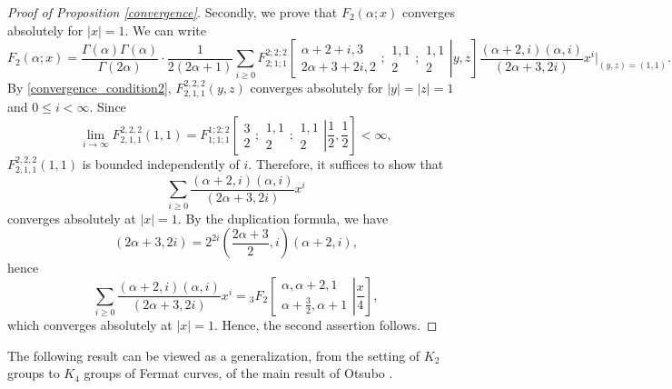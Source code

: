 \documentclass[11pt,a4,leqno]{amsart}
\theoremstyle{my theoremstyle}
\theoremstyle{dfn}
\theoremstyle{remark}
\renewcommand{\1}{\mathbbm{1}}
\newcommand{\al}{\alpha}
\numberwithin{equation}{section}
\begin{document}
\begin{proof}[Proof of Proposition \ref{convergence}]
Secondly, we prove that $F_2(\alpha; x)$ converges absolutely for $|x|=1$.   
We can write 
$$F_2(\al; x)=\dfrac{\Gamma\left(\al \right)\Gamma\left(\al\right)}{\Gamma\left(2\al \right)} \cdot \dfrac{1}{2(2 \alpha+1)}
\sum_{i \geq 0}
F_{2;1;1}^{2;2;2}\left[\left.
\begin{matrix}
\alpha+2+i, 3 \\
2 \alpha+3+2i, 2
\end{matrix}
; 
\begin{matrix}
1, 1 \\
2
\end{matrix}
;
\begin{matrix}
1, 1 \\
2
\end{matrix}
\right| y, z
\right]
\dfrac{(\alpha+2, i)(\alpha, i)}{(2\alpha+3, 2i)}x^i
\big|_{(y, z)=(1,1)}. 
$$
By \eqref{convergence_condition2}, $F_{2,1,1}^{2,2,2}(y, z)$ converges absolutely for $|y|=|z|=1$ and $0 \le i < \infty$.  
Since 
$$\lim_{i \to \infty}F_{2,1,1}^{2,2,2}(1, 1)=F_{1;1;1}^{1;2;2}\left[\left.
\begin{matrix}
3 \\
2
\end{matrix}
; 
\begin{matrix}
1, 1 \\
2
\end{matrix}
;
\begin{matrix}
1, 1 \\
2
\end{matrix}
\right| \frac12, \frac12
\right] < \infty, $$
$F_{2,1,1}^{2,2,2}(1, 1)$ is bounded independently of $i$. 
Therefore, it suffices to show that 
$$\sum_{i \ge 0} \dfrac{(\alpha+2, i)(\alpha, i)}{(2 \alpha+3, 2i)}x^i$$
converges absolutely at $|x|=1$. 
By the duplication formula, we have 
$$(2 \alpha+3, 2i)=2^{2i} \left(\dfrac{2 \alpha+3}2, i \right)\left(\alpha+2, i \right), $$
hence 
$$\sum_{i \ge 0} \dfrac{(\alpha+2, i)(\alpha, i)}{(2 \alpha+3, 2i)}x^i={_{3}F_{2}}\left[ \left. 
\begin{matrix}
\alpha, \alpha+2, 1 \\
\alpha+ \frac32, \alpha+1
\end{matrix}
\right| \frac{x}4
\right], $$
which converges absolutely at $|x|=1$. 
Hence, the second assertion follows. 
\end{proof}


The following result can be viewed as a generalization, from the setting of $K_2$ groups to $K_4$ groups of Fermat curves, of the main result of Otsubo \cite[Theorem 4.14]{Ots11}.
\end{document}
